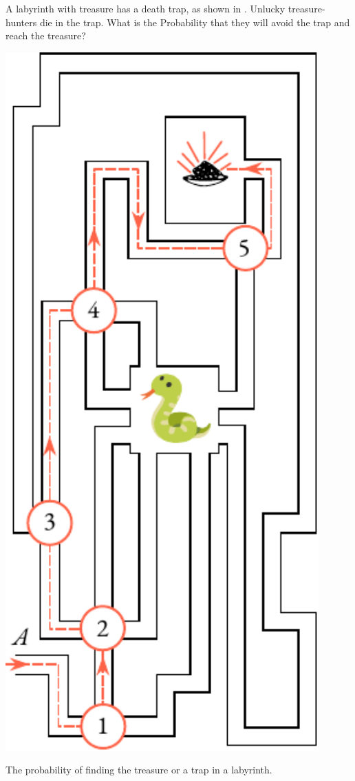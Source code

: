  A labyrinth with treasure has a
death trap, as shown in . Unlucky treasure-hunters
die in the trap. What is the Probability that they will avoid the trap
and reach the treasure?
\begin{marginfigure}[-3cm]
 \centering
 \includegraphics[width=0.9\textwidth]{figures/labyrinth.pdf}
\caption{The probability of finding the treasure or a trap in a labyrinth.\label{labyrinth}}
 \end{marginfigure}
 
